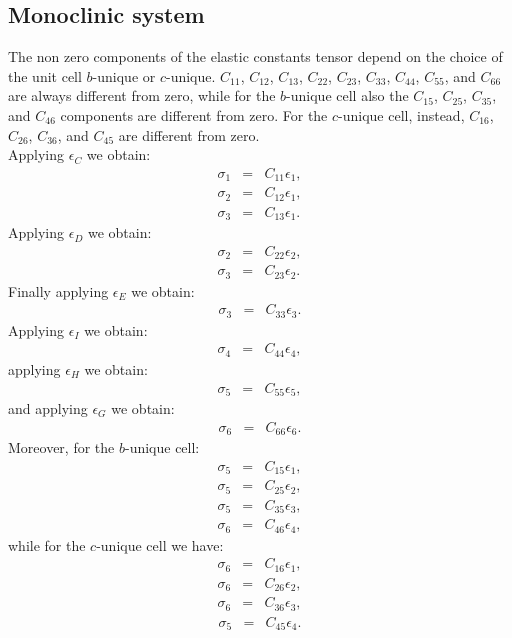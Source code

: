 \documentclass[12pt,a4paper]{article}
\begin{document}
\subsection{\color{web-blue}Monoclinic system}
The non zero components of the elastic constants tensor depend on the choice
of the unit cell $b$-unique or $c$-unique. 
$C_{11}$, $C_{12}$, $C_{13}$, $C_{22}$, $C_{23}$, $C_{33}$, $C_{44}$, 
$C_{55}$, and $C_{66}$ are always different from zero, while for the
$b$-unique cell also the $C_{15}$, $C_{25}$, $C_{35}$, and $C_{46}$ components
are different from zero. For the $c$-unique cell, instead, $C_{16}$, $C_{26}$, 
$C_{36}$, and $C_{45}$ are different from zero. \\
Applying $\epsilon_C$ we obtain:
\begin{eqnarray}
\sigma_1&=&C_{11} \epsilon_1,  \\
\sigma_2&=&C_{12} \epsilon_1,  \\
\sigma_3&=&C_{13} \epsilon_1.  
\end{eqnarray}
Applying $\epsilon_D$ we obtain:
\begin{eqnarray}
\sigma_2&=&C_{22} \epsilon_2,  \\
\sigma_3&=&C_{23} \epsilon_2.  
\end{eqnarray}
Finally applying $\epsilon_E$ we obtain:
\begin{eqnarray}
\sigma_3&=&C_{33} \epsilon_3.
\end{eqnarray}
Applying $\epsilon_I$ we obtain:
\begin{eqnarray}
\sigma_4&=&C_{44} \epsilon_4,
\end{eqnarray}
applying $\epsilon_H$ we obtain:
\begin{eqnarray}
\sigma_5&=&C_{55} \epsilon_5,
\end{eqnarray}
and applying $\epsilon_G$ we obtain:
\begin{eqnarray}
\sigma_6&=&C_{66} \epsilon_6. 
\end{eqnarray}
Moreover, for the $b$-unique cell: 
\begin{eqnarray}
\sigma_5&=&C_{15} \epsilon_1,
\end{eqnarray}
\begin{eqnarray}
\sigma_5&=&C_{25} \epsilon_2,
\end{eqnarray}
\begin{eqnarray}
\sigma_5&=&C_{35} \epsilon_3,
\end{eqnarray}
\begin{eqnarray}
\sigma_6&=&C_{46} \epsilon_4,
\end{eqnarray}
while for the $c$-unique cell we have:
\begin{eqnarray}
\sigma_6&=&C_{16} \epsilon_1,
\end{eqnarray}
\begin{eqnarray}
\sigma_6&=&C_{26} \epsilon_2,
\end{eqnarray}
\begin{eqnarray}
\sigma_6&=&C_{36} \epsilon_3,
\end{eqnarray}
\begin{eqnarray}
\sigma_5&=&C_{45} \epsilon_4.
\end{eqnarray}
\end{document}
